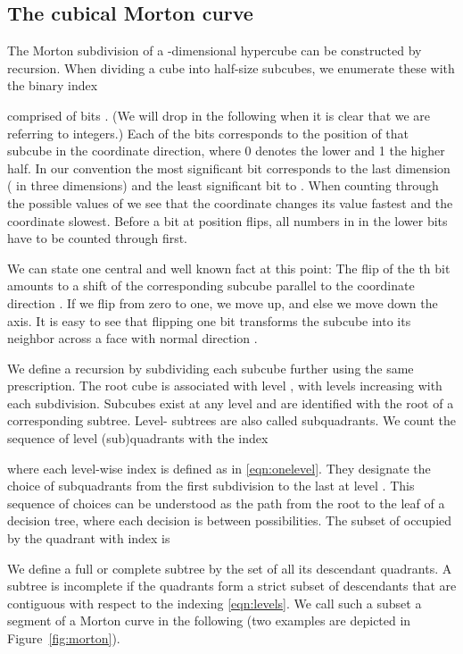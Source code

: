 \documentclass[a4paper,11pt]{article}
\newcommand{\eqnref}[1]{\eqref{eqn:#1}}
\newcommand{\figref}[1]{Figure~\ref{fig:#1}}
\newcommand{\seclab}[1]{\label{sec:#1}}
\begin{document}
\subsection{The cubical Morton curve}
\seclab{concepts-cubical}

The Morton subdivision of a -dimensional hypercube \cite{Morton66} can be
constructed by recursion.  When dividing a cube into  half-size subcubes,
we enumerate these with the binary index

comprised of  bits .  (We will drop  in the
following when it is clear that we are referring to integers.)
Each of the bits  corresponds to the position of that subcube in the 
coordinate direction, where 0 denotes the lower and 1 the higher half.  In
our convention the most significant bit corresponds to the last dimension (
in three dimensions) and the least significant bit to .
When counting through the possible values of  we see that the 
coordinate changes its value fastest and the  coordinate slowest.  Before
a bit at position  flips, all numbers in in the lower  bits have to be
counted through first.

We can state one central and well known fact at this point: The flip of the
th bit amounts to a shift of the corresponding subcube parallel to the
coordinate direction .  If we flip from zero to one, we move up, and else we
move down the axis.  It is easy to see that flipping one bit transforms the
subcube into its neighbor across a face with normal direction .

We define a recursion by subdividing each subcube further using the same
prescription.  The root cube is associated with level , with levels
increasing with each subdivision.  Subcubes exist at any level  and are
identified with the root of a corresponding subtree.  Level- subtrees are
also called subquadrants.  We count the sequence of level  (sub)quadrants
with the index

where each level-wise index  is defined as in \eqnref{onelevel}.
They designate the choice of subquadrants from the first subdivision
 to the last at level .  This sequence of choices can be
understood as the path from the root to the leaf of a decision tree, where each
decision is between  possibilities.  The subset of 
occupied by the quadrant with index  is


We define a full or complete subtree by the set of all its descendant
quadrants.  A subtree is incomplete if the quadrants form a strict subset of
descendants that are contiguous with respect to the indexing \eqnref{levels}.
We call such a subset a segment of a Morton curve in the following (two
examples are depicted in \figref{morton}).
\end{document}
